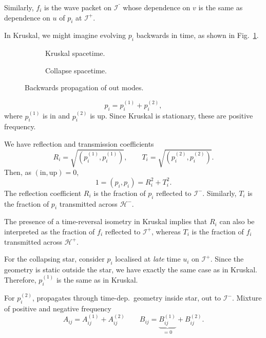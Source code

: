 Similarly, $f_i$ is the wave packet on $\mathscr{I}^⁻$ whose dependence on $v$ is the same as dependence on $u$ of $p_i$ at $\mathscr{I}^+$.

In Kruskal, we might imagine evolving $p_i$ backwards in time, as shown in Fig.~\ref{fig:l22f11}.
\begin{figure}[tbhp]
  \begin{subfigure}[b]{0.5\textwidth}
    \centering
    \caption{Kruskal spacetime.}
    \label{fig:l22f11}
  \end{subfigure}
  \begin{subfigure}[b]{0.5\textwidth}
    \centering
    \caption{Collapse spacetime.}
    \label{fig:l22f12}
  \end{subfigure}
  \caption{Backwards propagation of out modes.}
\end{figure}
\begin{equation}
  p_i = p_i^{(1)} + p_i^{(2)},
\end{equation}
where $p_i^{(1)}$ is in and $p_i^{(2)}$ is up.
Since Kruskal is stationary, these are positive frequency.

We have reflection and transmission coefficients
\begin{equation}
  R_i = \sqrt{(p_i^{(1)}, p_{i}^{(1)})}, \qquad T_i = \sqrt{(p_i^{(2)}, p_{i}^{(2)})}.
\end{equation}
Then, as $(\text{in}, \text{up}) = 0$,
\begin{equation}
  1 = (p_i, p_i) = R_i^2 + T_i^2.
\end{equation}
The reflection coefficient $R_i$ is the fraction of $p_i$ reflected to $\mathscr{I}^-$.
Similarly, $T_i$ is the fraction of $p_i$ transmitted across $\mathcal{H}^-$.

The presence of a time-reversal isometry in Kruskal implies that $R_i$ can also be interpreted as the fraction of $f_i$ reflected to $\mathscr{I}^+$, whereas $T_i$ is the fraction of $f_i$ transmitted across $\mathcal{H}^+$.

For the collapsing star, consider $p_i$ localised at \emph{late} time $u_i$ on $\mathscr{I}^+$.
Since the geometry is static outside the star, we have exactly the same case as in Kruskal. Therefore, $p_i^{(1)}$ is the same as in Kruskal.

For $p_i^{(2)}$, propagates through time-dep.~geometry inside star, out to $\mathscr{I}^-$.
Mixture of positive and negative frequency 
\begin{equation}
  A_{ij} = A_{ij}^{(1)} + A_{ij}^{(2)} \qquad B_{ij} = \underbrace{B_{ij}^{(1)}}_{= 0} + B_{ij}^{(2)}.
\end{equation}
